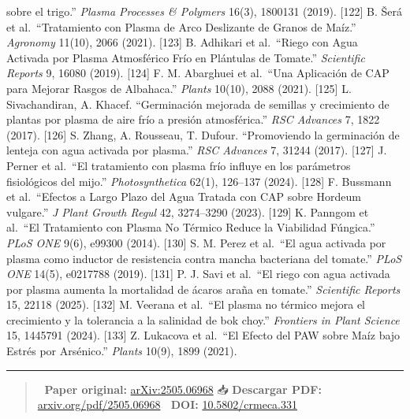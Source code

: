 \documentclass[
  10pt,
  letterpaper,
  twocolumn]{article}
\begin{document}
sobre el trigo.'' \emph{Plasma Processes \& Polymers} 16(3), 1800131
(2019). {[}122{]} B. Šerá et al.~``Tratamiento con Plasma de Arco
Deslizante de Granos de Maíz.'' \emph{Agronomy} 11(10), 2066 (2021).
{[}123{]} B. Adhikari et al.~``Riego con Agua Activada por Plasma
Atmosférico Frío en Plántulas de Tomate.'' \emph{Scientific Reports} 9,
16080 (2019). {[}124{]} F. M. Abarghuei et al.~``Una Aplicación de CAP
para Mejorar Rasgos de Albahaca.'' \emph{Plants} 10(10), 2088 (2021).
{[}125{]} L. Sivachandiran, A. Khacef. ``Germinación mejorada de
semillas y crecimiento de plantas por plasma de aire frío a presión
atmosférica.'' \emph{RSC Advances} 7, 1822 (2017). {[}126{]} S. Zhang,
A. Rousseau, T. Dufour. ``Promoviendo la germinación de lenteja con agua
activada por plasma.'' \emph{RSC Advances} 7, 31244 (2017). {[}127{]} J.
Perner et al.~``El tratamiento con plasma frío influye en los parámetros
fisiológicos del mijo.'' \emph{Photosynthetica} 62(1), 126--137 (2024).
{[}128{]} F. Bussmann et al.~``Efectos a Largo Plazo del Agua Tratada
con CAP sobre Hordeum vulgare.'' \emph{J Plant Growth Regul} 42,
3274--3290 (2023). {[}129{]} K. Panngom et al.~``El Tratamiento con
Plasma No Térmico Reduce la Viabilidad Fúngica.'' \emph{PLoS ONE} 9(6),
e99300 (2014). {[}130{]} S. M. Perez et al.~``El agua activada por
plasma como inductor de resistencia contra mancha bacteriana del
tomate.'' \emph{PLoS ONE} 14(5), e0217788 (2019). {[}131{]} P. J. Savi
et al.~``El riego con agua activada por plasma aumenta la mortalidad de
ácaros araña en tomate.'' \emph{Scientific Reports} 15, 22118 (2025).
{[}132{]} M. Veerana et al.~``El plasma no térmico mejora el crecimiento
y la tolerancia a la salinidad de bok choy.'' \emph{Frontiers in Plant
Science} 15, 1445791 (2024). {[}133{]} Z. Lukacova et al.~``El Efecto
del PAW sobre Maíz bajo Estrés por Arsénico.'' \emph{Plants} 10(9), 1899
(2021).

\begin{center}\rule{0.5\linewidth}{0.5pt}\end{center}

\begin{quote}
📄 \textbf{Paper original:}
\href{https://arxiv.org/abs/2505.06968}{arXiv:2505.06968} 📥
\textbf{Descargar PDF:}
\href{https://arxiv.org/pdf/2505.06968}{arxiv.org/pdf/2505.06968} 🔬
\textbf{DOI:}
\href{https://doi.org/10.5802/crmeca.331}{10.5802/crmeca.331}
\end{quote}
\end{document}
